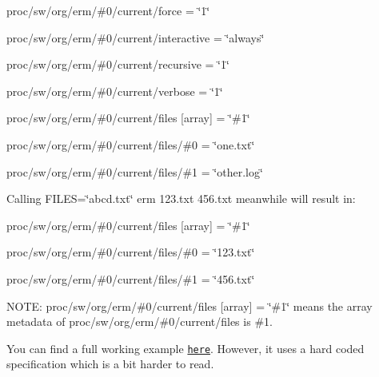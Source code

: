 \begin{DoxyItemize}
\item {\ttfamily proc/sw/org/erm/\#0/current/force = \char`\"{}1\char`\"{}}
\item {\ttfamily proc/sw/org/erm/\#0/current/interactive = \char`\"{}always\char`\"{}}
\item {\ttfamily proc/sw/org/erm/\#0/current/recursive = \char`\"{}1\char`\"{}}
\item {\ttfamily proc/sw/org/erm/\#0/current/verbose = \char`\"{}1\char`\"{}}
\item {\ttfamily proc/sw/org/erm/\#0/current/files \mbox{[}array\mbox{]} = \char`\"{}\#1\char`\"{}}
\item {\ttfamily proc/sw/org/erm/\#0/current/files/\#0 = \char`\"{}one.\+txt\char`\"{}}
\item {\ttfamily proc/sw/org/erm/\#0/current/files/\#1 = \char`\"{}other.\+log\char`\"{}}
\end{DoxyItemize}

Calling {\ttfamily F\+I\+L\+ES=\char`\"{}abcd.\+txt\char`\"{} erm 123.\+txt 456.\+txt} meanwhile will result in\+:


\begin{DoxyItemize}
\item {\ttfamily proc/sw/org/erm/\#0/current/files \mbox{[}array\mbox{]} = \char`\"{}\#1\char`\"{}}
\item {\ttfamily proc/sw/org/erm/\#0/current/files/\#0 = \char`\"{}123.\+txt\char`\"{}}
\item {\ttfamily proc/sw/org/erm/\#0/current/files/\#1 = \char`\"{}456.\+txt\char`\"{}}
\end{DoxyItemize}

N\+O\+TE\+: {\ttfamily proc/sw/org/erm/\#0/current/files \mbox{[}array\mbox{]} = \char`\"{}\#1\char`\"{}} means the {\ttfamily array} metadata of {\ttfamily proc/sw/org/erm/\#0/current/files} is {\ttfamily \#1}.

You can find a full working example \href{/home/jenkins/workspace/libelektra-release/examples/opts.c}{\tt here}. However, it uses a hard coded specification which is a bit harder to read. 